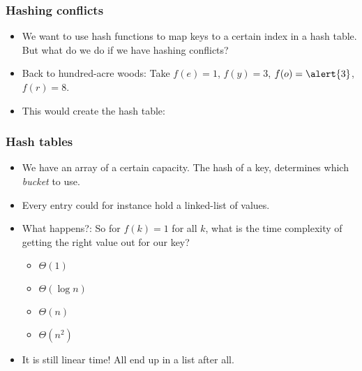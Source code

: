 \begin{frame}
	\frametitle{Hashing conflicts}

		\begin{itemize}
			\item We want to use hash functions to map keys to a certain index in a hash table.\\
		But what do we do if we have hashing conflicts?
			\item Back to hundred-acre woods:
		Take $f(e) = 1$, $f(y) = 3$, $f(o) = \alert{3}$, $f(r) = 8$.
		
			\item This would create the hash table:
		\begin{center}
			
		\end{center}
	\end{itemize}	
\end{frame}

\begin{frame}
	\frametitle{Hash tables}
		\begin{itemize}
			\item We have an array of a certain capacity.
		The hash of a key, determines which \textit{bucket} to use.
			\item Every entry could for instance hold a linked-list of values.
			\item What happens?:
		So for $f(k) = 1$ for all $k$, what is the time complexity of getting the right value out for our key?
		\begin{itemize}
			\item $\Theta(1)$
			\item $\Theta(\log n)$
			\item $\Theta(n)$
			\item $\Theta(n^2)$
		\end{itemize}
			\item It is still linear time! All end up in a list after all.
		\end{itemize}
\end{frame}

